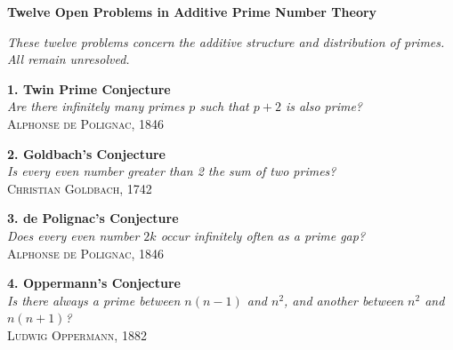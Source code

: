 \begin{center}
  {\Large \textbf{Twelve Open Problems in Additive Prime Number Theory}}

  \vspace{0.5em}
  \textit{These twelve problems concern the additive structure and distribution of primes. All remain unresolved.}

  \vspace{1em}

  \begin{tcolorbox}[
    colback=gray!2,
    colframe=gray!60,
    boxrule=0.4pt,
    width=\textwidth,
    arc=1pt,
    left=6pt,
    right=6pt,
    top=6pt,
    bottom=6pt,
    shadow={0mm}{-0.5mm}{0mm}{gray!40}
  ]

  \noindent\begin{minipage}{0.44\textwidth}
    \textbf{1. Twin Prime Conjecture}\\
    \emph{Are there infinitely many primes \(p\) such that \(p+2\) is also prime?}\\
    \hfill\textsc{Alphonse de Polignac, 1846}
  \end{minipage}\hfill
  \begin{minipage}{0.44\textwidth}
    \textbf{2. Goldbach's Conjecture}\\
    \emph{Is every even number greater than 2 the sum of two primes?}\\
    \hfill\textsc{Christian Goldbach, 1742}
  \end{minipage}

  \vspace{2em}

  \noindent\begin{minipage}{0.44\textwidth}
    \textbf{3. de Polignac's Conjecture}\\
    \emph{Does every even number \(2k\) occur infinitely often as a prime gap?}\\
    \hfill\textsc{Alphonse de Polignac, 1846}
  \end{minipage}\hfill
  \begin{minipage}{0.44\textwidth}
    \textbf{4. Oppermann's Conjecture}\\
    \emph{Is there always a prime between \(n(n - 1)\) and \(n^2\), and another between \(n^2\) and \(n(n + 1)\)?}\\
    \hfill\textsc{Ludwig Oppermann, 1882}
  \end{minipage}

  \vspace{2em}


\end{tcolorbox}
\end{center}
